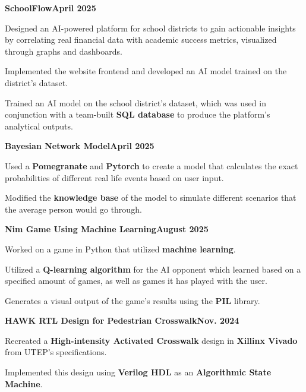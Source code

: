 \documentclass[letterpaper,10pt]{article}
\newcommand{\heading}[2]{
  \hspace{10pt}#1\hfill#2\\
}
\newcommand{\headingBf}[2]{
  \heading{\textbf{#1}}{\textbf{#2}}
}
\newenvironment{resume_list}{
  \vspace{-7pt}
  \begin{itemize}[itemsep=-2px, parsep=1pt, leftmargin=30pt]
}{
  \end{itemize}
}
\begin{document}
\vspace{0pt}
\headingBf{\large{SchoolFlow}}{April 2025}
\begin{resume_list}
  \vspace{2pt}
    \item Designed an AI-powered platform for school districts to gain actionable insights by correlating real financial data with academic success metrics, visualized through graphs and dashboards.
    \vspace{1pt}
    \item Implemented the website frontend and developed an AI model trained on the district's dataset.
    \item Trained an AI model on the school district's dataset, which was used in conjunction with a team-built \textbf{SQL database} to produce the platform's analytical outputs.
\end{resume_list}

\vspace{0pt}
\headingBf{\large{Bayesian Network Model}}{April 2025}
\begin{resume_list}
  \vspace{2pt}
    \item Used a \textbf{Pomegranate} and \textbf{Pytorch} to create a model that calculates the exact probabilities of different real life events based on user input.
    \vspace{1pt}
    \item Modified the \textbf{knowledge base} of the model to simulate different scenarios that the average person would go through.
\end{resume_list}

\vspace{0pt}
\headingBf{\large{Nim Game Using Machine Learning}}{August 2025}
\begin{resume_list}
  \item Worked on a game in Python that utilized \textbf{machine learning}.
  \vspace{1pt}
  \item Utilized a \textbf{Q-learning algorithm} for the AI opponent which learned based on a specified amount of games, as well as games it has played with the user.
  \vspace{1pt}
  \item Generates a visual output of the game's results using the \textbf{PIL} library.
\end{resume_list}

\vspace{0pt}
\headingBf{\large{HAWK RTL Design for Pedestrian Crosswalk}}{Nov. 2024}
\begin{resume_list}
  \item Recreated a \textbf{High-intensity Activated Crosswalk} design in \textbf{Xillinx Vivado} from UTEP's specifications.
  \vspace{1pt}
  \item Implemented this design using \textbf{Verilog HDL} as an \textbf{Algorithmic State Machine}.
\end{resume_list}
\end{document}
